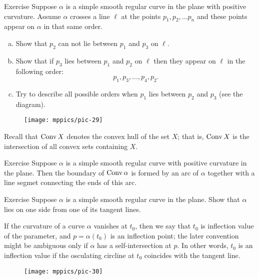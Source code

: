 \begin{thm}{Exercise}
Suppose $\alpha$ is a simple smooth regular curve in the plane with positive curvature.
Assume $\alpha$ crosses a line $\ell$ at the points $p_1,p_2,\dots p_n$ and these points appear on $\alpha$ in that same order.
\begin{enumerate}[(a)]

\item Show that $p_2$ can not lie between $p_1$ and $p_3$ on $\ell$.

\item Show that if $p_3$ lies between $p_1$ and $p_2$ on $\ell$ then they appear on $\ell$ in the following order:  
\[p_1,p_3,\dots,p_4 ,p_2.\]

\item Try to describe all possible orders when $p_1$ lies between $p_2$ and $p_3$ (see the diagram).

\end{enumerate}
\end{thm}

\begin{figure}[h!]
\vskip-0mm
\centering
\texttt{[image: mppics/pic-29]}
\vskip0mm
\end{figure}

Recall that $\mathop{\rm Conv}\nolimits X$ denotes the convex hull of the set $X$;
that is, $\mathop{\rm Conv}\nolimits X$ is the intersection of all convex sets containing $X$.

\begin{thm}{Exercise}\label{ex:convex-hull}
Suppose $\alpha$ is a simple smooth regular curve with positive curvature in the plane.
Then the boundary of $\mathop{\rm Conv}\nolimits \alpha$ is formed by an arc of $\alpha$ together with a line segmet connecting the ends of this arc.
\end{thm}

\begin{thm}{Exercise}
Suppose $\alpha$ is a simple smooth regular curve in the plane.
Show that $\alpha$ lies on one side from one of its tangent lines. 
\end{thm}

If the curvature of a curve $\alpha$ vanishes at $t_0$, then we say that $t_0$ is inflection value of the parameter, and $p=\alpha(t_0)$ is an inflection point;
the later convention might be ambiguous only if $\alpha$ has a self-intersection at $p$. 
In other words, $t_0$ is an inflection value if the osculating circline at $t_0$ coincides with the tangent line. 

\begin{figure}[h!]%
\centering
\texttt{[image: mppics/pic-30]}
\vskip0mm
\end{figure}


